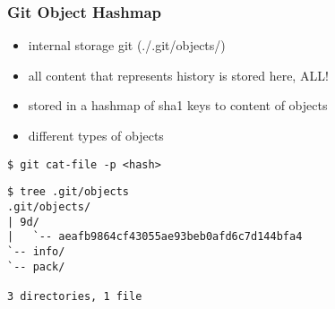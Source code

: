 \begin{frame}[fragile]
	\frametitle{Git Object Hashmap}
	\begin{block}{}
		\begin{itemize}
			\item internal storage git (./.git/objects/)
			\item all content that represents history is stored here, ALL!
			\item stored in a hashmap of sha1 keys to content of objects
			\item different types of objects
		\end{itemize}
	\end{block}

	\begin{lstlisting}
$ git cat-file -p <hash>
	\end{lstlisting}

\end{frame}

\begin{frame}[fragile]
	\begin{lstlisting}
$ tree .git/objects
.git/objects/
| 9d/
|   `-- aeafb9864cf43055ae93beb0afd6c7d144bfa4
`-- info/
`-- pack/

3 directories, 1 file
	\end{lstlisting}

\end{frame}
